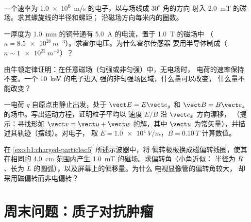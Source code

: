 \begin{exercise}[$\star\star$]\label{exo:b1:charged-particles:8}
一个速率为 \qty{1.0e6}{m/s} 的电子，以与场线成 $30^\circ$ 角的方向
射入 \qty{2.0}{mT} 的磁场。求其螺旋线的半径和螺距；
沿磁场方向每米内的圈数。
\end{exercise}

\begin{exercise}[$\star\star$]\label{exo:b1:charged-particles:9}
一厚度为 \qty{1.0}{mm} 的铜带通有 \qty{5.0}{A} 的电流，置于 \qty{1.0}{T} 的磁场中
（$n = \qty{8.5e28}{m^{-3}}$）。求霍尔电压。为什么霍尔传感器
要用半导体制成（$n \sim \qty{1e22}{m^{-3}}$）？
\end{exercise}

\begin{exercise}[$\star\star\star$]\label{exo:b1:charged-particles:10}
由牛顿定律证明：在任意磁场（匀强或非匀强）中，无电场时，
电荷的速率保持不变。一个 \qty{10}{keV} 的电子进入
强的非匀强场区域，什么量可以改变，
什么量不能改变？
\end{exercise}

\begin{exercise}[$\star\star\star$]\label{exo:b1:charged-particles:11}
一电荷 $q$ 自原点由静止出发，处于 $\vect E = E\vect e_y$ 和
$\vect B = B\vect e_z$ 的场中。写出运动方程，证明粒子平均以
速度 $E/B$ 沿 $\vect e_x$ 方向漂移，
（提示：寻找形如 $\vect v = \vect u + \vect w$ 的解，其中
$\vect u$ 为常矢量），并描述其轨迹（摆线）。对电子，
取 $E = \qty{1.0e4}{V/m}$，$B = \qty{0.10}{T}$ 计算数值。
\end{exercise}

\begin{exercise}[$\star\star\star$]\label{exo:b1:charged-particles:12}
在 \cref{exo:b1:charged-particles:5} 所述示波器中，将
偏转极板换成磁偏转线圈，使其在相同的
\qty{4.0}{cm} 范围内产生 \qty{1.0}{mT} 的磁场。求偏转角（小角近似：
半径为 $R$、长为 $L$ 的圆弧），以及屏幕上的偏移量。为什么
电视显像管的偏转角较大，
却采用磁偏转而非电偏转？
\end{exercise}

\section{周末问题：质子对抗肿瘤}

